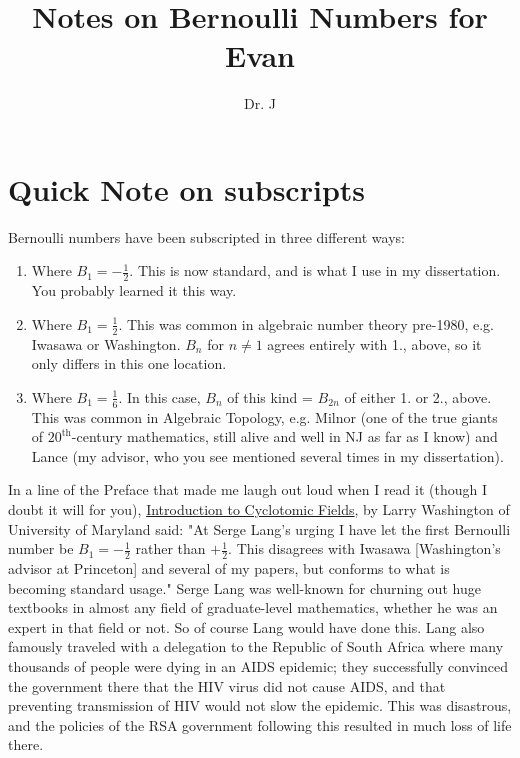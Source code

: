 \documentclass[12pt]{article}
\title{Notes on Bernoulli Numbers for Evan}
\author{Dr. J}
\begin{document}
\maketitle

\section{Quick Note on subscripts}

Bernoulli numbers have been subscripted in three different ways:
\begin{enumerate}
	\item
Where $B_1 = -\frac{1}{2}$.  This is now standard, and is what I use in my dissertation.  You probably learned it this way.
	\item
Where $B_1 = \frac{1}{2}$.  This was common in algebraic number theory pre-1980, e.g. Iwasawa or Washington.  $B_n$ for $n \neq 1$ agrees entirely with 1., above, so it only differs in this one location.
	\item
Where $B_1 = \frac{1}{6}$.  In this case, $B_n$ of this kind = $B_{2n}$ of either 1. or 2., above.  This was common in Algebraic Topology, e.g. Milnor (one of the true giants of $20^{\text{th}}$-century mathematics, still alive and well in NJ as far as I know) and Lance (my advisor, who you see mentioned several times in my dissertation).
\end{enumerate}

In a line of the Preface that made me laugh out loud when I read it (though I doubt it will for you), \underline{Introduction to Cyclotomic Fields}, by Larry Washington of University of Maryland said: "At Serge Lang's urging I have let the first Bernoulli number be $B_1 = -\frac{1}{2}$ rather than $+\frac{1}{2}$.  This disagrees with Iwasawa [Washington's advisor at Princeton] and several of my papers, but conforms to what is becoming standard usage."  Serge Lang was well-known for churning out huge textbooks in almost any field of graduate-level mathematics, whether he was an expert in that field or not.  So of course Lang would have done this.  Lang also famously traveled with a delegation to the Republic of South Africa where many thousands of people were dying in an AIDS epidemic; they successfully convinced the government there that the HIV virus did not cause AIDS, and that preventing transmission of HIV would not slow the epidemic.  This was disastrous, and the policies of the RSA government following this resulted in much loss of life there.
\end{document}
